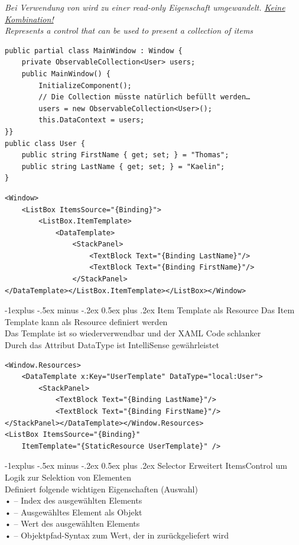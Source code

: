 \documentclass[10pt,landscape,a4paper]{article}
\makeatletter
\renewcommand{\subsection}{\@startsection{subsection}{2}{0mm}%
                                {-1explus -.5ex minus -.2ex}%
                                {0.5ex plus .2ex}%
                                {\normalfont\small\bfseries}}
\makeatother
\begin{document}
\begin{multicols*}{3}
\textit{Bei Verwendung von  wird  zu einer
read-only Eigenschaft umgewandelt.  \underline{Keine Kombination!}}\\
\textit{Represents a control that can be used to present a collection of items}
\begin{verbatim}
public partial class MainWindow : Window {
    private ObservableCollection<User> users;
    public MainWindow() {
        InitializeComponent();
        // Die Collection müsste natürlich befüllt werden…
        users = new ObservableCollection<User>();
        this.DataContext = users;
}}
public class User {
    public string FirstName { get; set; } = "Thomas";
    public string LastName { get; set; } = "Kaelin";
}
\end{verbatim}
\begin{verbatim}
<Window>
    <ListBox ItemsSource="{Binding}">
        <ListBox.ItemTemplate>
            <DataTemplate>
                <StackPanel>
                    <TextBlock Text="{Binding LastName}"/>
                    <TextBlock Text="{Binding FirstName}"/>
                </StackPanel>
</DataTemplate></ListBox.ItemTemplate></ListBox></Window>
\end{verbatim}
\subsection{Item Template als Resource}
Das Item Template kann als Resource definiert werden\\
Das Template ist so wiederverwendbar und der XAML Code schlanker\\
Durch das Attribut DataType ist IntelliSense gewährleistet
\begin{verbatim}
<Window.Resources>
    <DataTemplate x:Key="UserTemplate" DataType="local:User">
        <StackPanel>
            <TextBlock Text="{Binding LastName}"/>
            <TextBlock Text="{Binding FirstName}"/>
</StackPanel></DataTemplate></Window.Resources>
<ListBox ItemsSource="{Binding}"
    ItemTemplate="{StaticResource UserTemplate}" />
\end{verbatim}
\subsection{Selector}
Erweitert ItemsControl um Logik zur Selektion von Elementen\\
Definiert folgende wichtigen Eigenschaften (Auswahl)\\
•  – Index des ausgewählten Elements\\
•  – Ausgewähltes Element als Objekt\\
•  – Wert des ausgewählten Elements\\
•  – Objektpfad-Syntax zum Wert, der in  zurückgeliefert wird\\


\end{multicols*}
\end{document}
